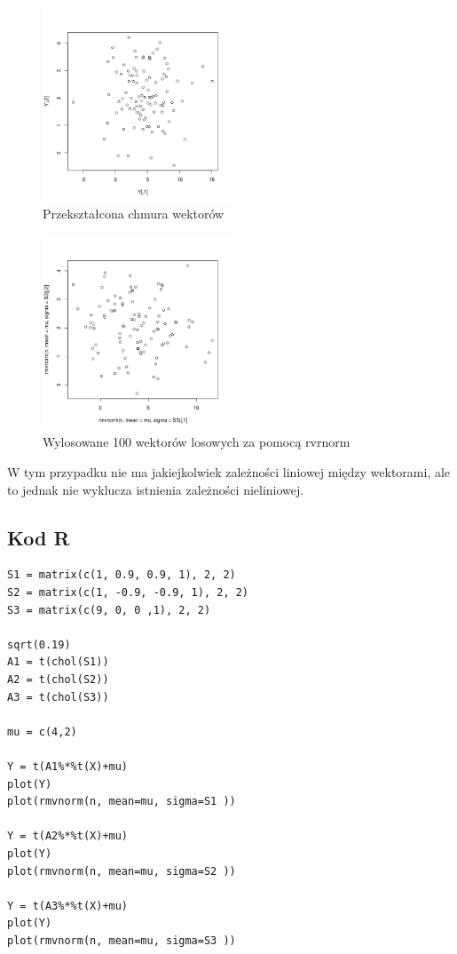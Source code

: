 \documentclass[9pt]{article}  %
\begin{document}
      
    \begin{figure}[H]
      \centering
      \includegraphics[width=0.5\textwidth]{23.png}
      \caption {Przekształcona chmura wektorów}
    \end{figure}
    
        \begin{figure}[H]
      \centering
      \includegraphics[width=0.5\textwidth]{23m.png}
      \caption {Wylosowane 100 wektorów losowych za pomocą rvrnorm}
    \end{figure} 
    
    W tym przypadku nie ma jakiejkolwiek zależności liniowej między wektorami, ale to jednak nie wyklucza istnienia zależności nieliniowej.\newline \newline
    
    
    \subsection{Kod R}
    
    \begin{lstlisting}
S1 = matrix(c(1, 0.9, 0.9, 1), 2, 2)
S2 = matrix(c(1, -0.9, -0.9, 1), 2, 2)
S3 = matrix(c(9, 0, 0 ,1), 2, 2)

sqrt(0.19)
A1 = t(chol(S1))
A2 = t(chol(S2))
A3 = t(chol(S3))

mu = c(4,2)

Y = t(A1%*%t(X)+mu)
plot(Y)
plot(rmvnorm(n, mean=mu, sigma=S1 ))

Y = t(A2%*%t(X)+mu)
plot(Y)
plot(rmvnorm(n, mean=mu, sigma=S2 ))

Y = t(A3%*%t(X)+mu)
plot(Y)
plot(rmvnorm(n, mean=mu, sigma=S3 ))
    \end{lstlisting}   
\end{document}
